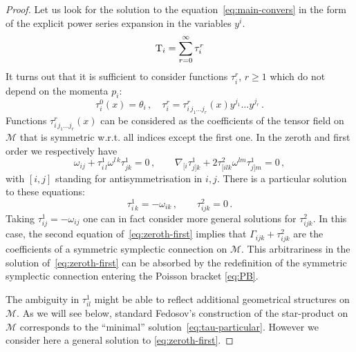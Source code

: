 \documentclass[a4paper,11pt,oneside]{amsart}
\theoremstyle{plain}
\numberwithin{equation}{section} %
\numberwithin{figure}{section} %
\def\cT{{\rm T}}
\def\manM{{\mathcal M}}
\begin{document}
\begin{proof}
Let us look for the solution to the equation~\eqref{eq:main-convers}
in the form of the explicit power series expansion
in the variables $y^i$.
\begin{equation}
\label{eq:expansion}
\cT_i=\sum^\infty_{r=0} \tau^r_i
\end{equation}
It turns out that it is sufficient to consider functions
$\tau^r_i,\, r \geq 1$ which do not depend on the momenta $p_i$:
\begin{equation}
\tau^0_i(x)=\theta_i\,, \quad
\tau^r_i=\tau^r_{i\, j_1\ldots
j_r}(x)y^{j_1}\ldots y^{j_r}\,.
\end{equation}
Functions $\tau^r_{i\, j_1\ldots j_r}(x)$ can
be considered as the coefficients of the tensor field
on $\manM$ that is symmetric w.r.t. all indices except
the first one.  In the zeroth and first order we
respectively have
\begin{equation}
\label{eq:zeroth-first}
\omega_{ij}+\tau^1_{i\,l} \omega^{l\,k}\tau^1_{jk}=0\,,
\qquad
\nabla_{[i}\tau^1_{j]k}+2\tau^2_{[ilk}\omega^{lm}\tau^1_{j]m}=0\, ,
\end{equation}
with $[i,j]$ standing for antisymmetrisation in $i,j$.
There is a particular solution to these equations:
\begin{equation}
\tau^1_{i\,k}=-\omega_{ik}\,,\qquad \tau^2_{ijk}=0\,.
\label{eq:tau-particular}
\end{equation}
Taking $\tau^1_{ij}=-\omega_{ij}$ one can in fact
consider more general solutions for $\tau^2_{ijk}$. In this case,
the second equation of~\eqref{eq:zeroth-first} implies that
$\Gamma_{ijk}+\tau^2_{ijk}$ are the coefficients of a symmetric
symplectic connection on $\manM$. This arbitrariness
in the solution of~\eqref{eq:zeroth-first} can be absorbed
by the redefinition of the symmetric symplectic connection
entering the Poisson bracket \eqref{eq:PB}.

\noindent
The ambiguity in $\tau^1_{il}$ might be able to reflect
additional geometrical structures on $\manM$.  As we
will see below, standard Fedosov's construction of the
star-product on $\manM$ corresponds to the ``minimal''
solution~\eqref{eq:tau-particular}. However we consider here a
general solution to \eqref{eq:zeroth-first}.



\end{proof}
\end{document}
